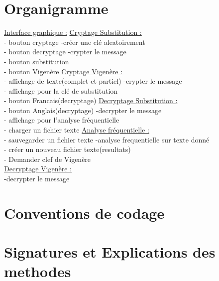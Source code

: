 \documentclass[a4]{article}
\begin{document}
	\section{Organigramme}
			\underline{Interface graphique :}     \hspace{5cm}  \underline{Cryptage Substitution :}\\
			- bouton cryptage            \hspace{5.5cm}       -créer une clé aleatoirement\\
			- bouton decryptage         \hspace{5cm}        -crypter le message\\
			- bouton substitution\\
			- bouton Vigenère           \hspace{5.2cm}       \underline{Cryptage Vigenère :}\\
			- affichage de texte(complet et partiel)  \hspace{2.2cm} -crypter le message\\
			- affichage pour la clé de substitution\\
			- bouton Francais(decryptage)   \hspace{3.5cm}     \underline{Decryptage Substitution :}\\
			- bouton Anglais(decryptage)    \hspace{3.5cm}     -decrypter le message\\
			- affichage pour l'analyse fréquentielle\\
			- charger un fichier texte       \hspace{4.2cm}  \underline{Analyse fréquentielle :}\\
			- sauvegarder un fichier texte     \hspace{3.8cm}  -analyse frequentielle sur texte donné\\
			- créer un nouveau fichier texte(resultats)\\
			- Demander clef de Vigenère\\
			\underline{Decryptage Vigenère :}\\
			-decrypter le message
			
			
			\section{Conventions de codage}
			
	\section{Signatures et Explications des methodes}
\end{document}
